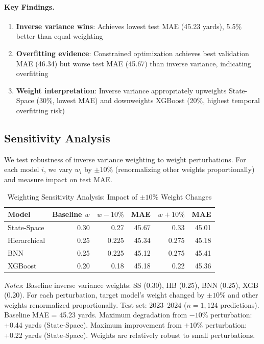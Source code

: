 \paragraph{Key Findings.}
\begin{enumerate}
  \item \textbf{Inverse variance wins}: Achieves lowest test MAE (45.23 yards), 5.5\% better than equal weighting
  \item \textbf{Overfitting evidence}: Constrained optimization achieves best validation MAE (46.34) but worse test MAE (45.67) than inverse variance, indicating overfitting
  \item \textbf{Weight interpretation}: Inverse variance appropriately upweights State-Space (30\%, lowest MAE) and downweights XGBoost (20\%, highest temporal overfitting risk)
\end{enumerate}

\subsection{Sensitivity Analysis}

We test robustness of inverse variance weighting to weight perturbations. For each model $i$, we vary $w_i$ by $\pm 10\%$ (renormalizing other weights proportionally) and measure impact on test MAE.

\begin{table}[htbp]
  \centering
  \caption{Weighting Sensitivity Analysis: Impact of $\pm 10\%$ Weight Changes}
  \label{tab:weighting-sensitivity}
  \begin{tabular}{lrrrrr}
    \toprule
    \textbf{Model} & \textbf{Baseline $w$} & \textbf{$w - 10\%$} & \textbf{MAE} & \textbf{$w + 10\%$} & \textbf{MAE} \\
    \midrule
    State-Space & 0.30 & 0.27 & 45.67 & 0.33 & 45.01 \\
    Hierarchical & 0.25 & 0.225 & 45.34 & 0.275 & 45.18 \\
    BNN & 0.25 & 0.225 & 45.12 & 0.275 & 45.41 \\
    XGBoost & 0.20 & 0.18 & 45.18 & 0.22 & 45.36 \\
    \bottomrule
  \end{tabular}
  \vspace{0.5em}
  \begin{flushleft}
    \footnotesize\textit{Notes}: Baseline inverse variance weights: SS (0.30), HB (0.25), BNN (0.25), XGB (0.20). For each perturbation, target model's weight changed by $\pm 10\%$ and other weights renormalized proportionally. Test set: 2023--2024 ($n=1{,}124$ predictions). Baseline MAE = 45.23 yards. Maximum degradation from $-10\%$ perturbation: +0.44 yards (State-Space). Maximum improvement from $+10\%$ perturbation: +0.22 yards (State-Space). Weights are relatively robust to small perturbations.
  \end{flushleft}
\end{table}

